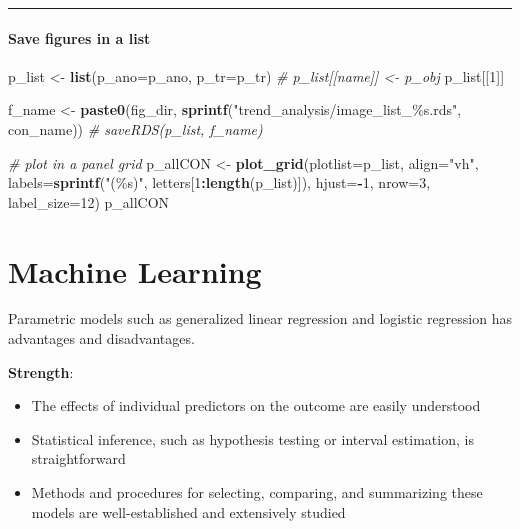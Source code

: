 \documentclass[
]{book}
\newenvironment{Shaded}{\begin{snugshade}}{\end{snugshade}}
\newcommand{\AttributeTok}[1]{\textcolor[rgb]{0.13,0.29,0.53}{#1}}
\newcommand{\CommentTok}[1]{\textcolor[rgb]{0.56,0.35,0.01}{\textit{#1}}}
\newcommand{\DecValTok}[1]{\textcolor[rgb]{0.00,0.00,0.81}{#1}}
\newcommand{\FunctionTok}[1]{\textcolor[rgb]{0.13,0.29,0.53}{\textbf{#1}}}
\newcommand{\NormalTok}[1]{#1}
\newcommand{\OtherTok}[1]{\textcolor[rgb]{0.56,0.35,0.01}{#1}}
\newcommand{\SpecialCharTok}[1]{\textcolor[rgb]{0.81,0.36,0.00}{\textbf{#1}}}
\newcommand{\StringTok}[1]{\textcolor[rgb]{0.31,0.60,0.02}{#1}}
\providecommand{\tightlist}{%
  \setlength{\itemsep}{0pt}\setlength{\parskip}{0pt}}
\begin{document}
\begin{center}\rule{0.5\linewidth}{0.5pt}\end{center}

\subsubsection*{Save figures in a list}\label{save-figures-in-a-list}

\begin{Shaded}
\begin{Highlighting}[]
\NormalTok{p\_list }\OtherTok{\textless{}{-}} \FunctionTok{list}\NormalTok{(}\AttributeTok{p\_ano=}\NormalTok{p\_ano, }\AttributeTok{p\_tr=}\NormalTok{p\_tr)}
\CommentTok{\# p\_list[[name]] \textless{}{-} p\_obj}
\NormalTok{p\_list[[}\DecValTok{1}\NormalTok{]]}

\NormalTok{f\_name }\OtherTok{\textless{}{-}} \FunctionTok{paste0}\NormalTok{(fig\_dir, }\FunctionTok{sprintf}\NormalTok{(}\StringTok{"trend\_analysis/image\_list\_\%s.rds"}\NormalTok{, con\_name))}
\CommentTok{\# saveRDS(p\_list, f\_name)}

\CommentTok{\# plot in a panel grid}
\NormalTok{p\_allCON }\OtherTok{\textless{}{-}} \FunctionTok{plot\_grid}\NormalTok{(}\AttributeTok{plotlist=}\NormalTok{p\_list, }\AttributeTok{align=}\StringTok{"vh"}\NormalTok{, }\AttributeTok{labels=}\FunctionTok{sprintf}\NormalTok{(}\StringTok{"(\%s)"}\NormalTok{, letters[}\DecValTok{1}\SpecialCharTok{:}\FunctionTok{length}\NormalTok{(p\_list)]), }\AttributeTok{hjust=}\SpecialCharTok{{-}}\DecValTok{1}\NormalTok{, }\AttributeTok{nrow=}\DecValTok{3}\NormalTok{, }\AttributeTok{label\_size=}\DecValTok{12}\NormalTok{)}
\NormalTok{p\_allCON}
\end{Highlighting}
\end{Shaded}

\chapter{Machine Learning}\label{machine-learning}

Parametric models such as generalized linear regression and logistic regression has advantages and disadvantages.

\textbf{Strength}:

\begin{itemize}
\tightlist
\item
  The effects of individual predictors on the outcome are easily understood
\item
  Statistical inference, such as hypothesis testing or interval estimation, is straightforward
\item
  Methods and procedures for selecting, comparing, and summarizing these models are well-established and extensively studied
\end{itemize}
\end{document}
